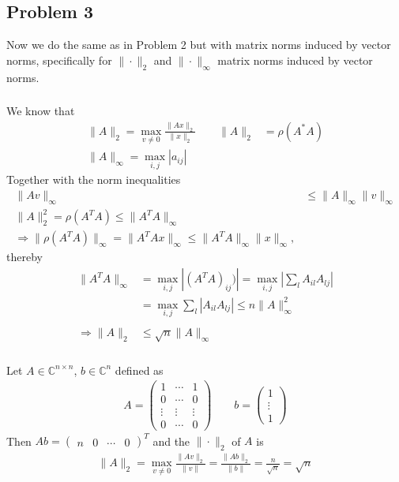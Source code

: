 \subsection{Problem 3}
Now we do the same as in Problem 2 but with matrix norms induced by vector
norms, specifically for $\|\cdot\|_2$ and $\|\cdot\|_\infty$ matrix norms
induced by vector norms.
\subsubsection{}
We know that
\begin{align}
    \|A\|_2 = \max_{v\neq 0} \frac{\|Ax\|_2}{\|x\|_2} \qquad \|A\|_2 &=
    \rho(A^*A)\\
    \|A\|_\infty = \max_{i,j}  |a_{ij}|
\end{align}
Together with the norm inequalities
\begin{align}
    \|Av\|_\infty &\le \|A\|_\infty \|v\|_\infty\\
    \|A\|_2^2 = \rho(A^TA) \le \|A^TA\|_\infty\\
    \Rightarrow \|\rho(A^TA)\|_\infty = \|A^TA x\|_\infty \le \|A^T
    A\|_\infty \|x\|_\infty,
\end{align}
thereby
\begin{align}
    \|A^T A\|_\infty &= \max_{i,j} \left|(A^T A)_{ij})\right| = \max_{i,j}
    \left| \sum_l A_{il} A_{lj} \right|  \\
                    &=\max_{i,j} \sum_l \left| A_{il} A_{lj} \right| \leq n
                    \|A\|_\infty^2\\
                    \nonumber\\
    \Rightarrow  \|A\|_2 &\leq \sqrt{n} \|A\|_\infty
\end{align}
\subsubsection{}
Let $A \in \mathbb{C}^{n\times n}$, $b \in \mathbb{C}^n$ defined as
\begin{align}
    A =
    \begin{pmatrix}
        1 & \cdots  &  1 \\
        0 & \cdots  &  0 \\
        \vdots & \vdots  &\vdots   \\
        0 & \cdots & 0
        \end{pmatrix} \qquad b = \begin{pmatrix} 1 \\ \vdots \\ 1
    \end{pmatrix}
\end{align}
Then $Ab = \begin{pmatrix} n & 0 & \cdots & 0 \end{pmatrix}^T$ and the
$\|\cdot\|_2$ of $A$ is
\begin{align}
    \|A\|_2 = \max_{v\neq 0} \frac{\|Av\|_2}{\|v\|} = \frac{\|Ab\|_2}{\|b\|}
    = \frac{n}{\sqrt{n}} = \sqrt{n}
\end{align}
